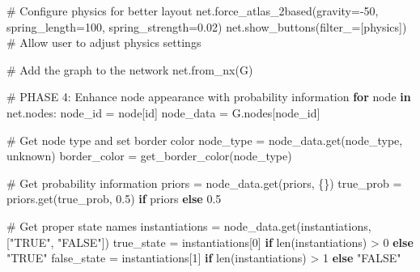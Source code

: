\documentclass[
  11pt,
  letterpaper,
]{book}
\newenvironment{Shaded}{\begin{snugshade}}{\end{snugshade}}
\newcommand{\BuiltInTok}[1]{\textcolor[rgb]{0.00,0.23,0.31}{#1}}
\newcommand{\CommentTok}[1]{\textcolor[rgb]{0.37,0.37,0.37}{#1}}
\newcommand{\ControlFlowTok}[1]{\textcolor[rgb]{0.00,0.23,0.31}{\textbf{#1}}}
\newcommand{\DecValTok}[1]{\textcolor[rgb]{0.68,0.00,0.00}{#1}}
\newcommand{\FloatTok}[1]{\textcolor[rgb]{0.68,0.00,0.00}{#1}}
\newcommand{\KeywordTok}[1]{\textcolor[rgb]{0.00,0.23,0.31}{\textbf{#1}}}
\newcommand{\NormalTok}[1]{\textcolor[rgb]{0.00,0.23,0.31}{#1}}
\newcommand{\OperatorTok}[1]{\textcolor[rgb]{0.37,0.37,0.37}{#1}}
\newcommand{\StringTok}[1]{\textcolor[rgb]{0.13,0.47,0.30}{#1}}
\begin{document}
\begin{Shaded}
\begin{Highlighting}[]
    \CommentTok{\# Configure physics for better layout}
\NormalTok{    net.force\_atlas\_2based(gravity}\OperatorTok{={-}}\DecValTok{50}\NormalTok{, spring\_length}\OperatorTok{=}\DecValTok{100}\NormalTok{, spring\_strength}\OperatorTok{=}\FloatTok{0.02}\NormalTok{)}
\NormalTok{    net.show\_buttons(filter\_}\OperatorTok{=}\NormalTok{[}\StringTok{\textquotesingle{}physics\textquotesingle{}}\NormalTok{])  }\CommentTok{\# Allow user to adjust physics settings}

    \CommentTok{\# Add the graph to the network}
\NormalTok{    net.from\_nx(G)}

    \CommentTok{\# PHASE 4: Enhance node appearance with probability information}
    \ControlFlowTok{for}\NormalTok{ node }\KeywordTok{in}\NormalTok{ net.nodes:}
\NormalTok{        node\_id }\OperatorTok{=}\NormalTok{ node[}\StringTok{\textquotesingle{}id\textquotesingle{}}\NormalTok{]}
\NormalTok{        node\_data }\OperatorTok{=}\NormalTok{ G.nodes[node\_id]}

        \CommentTok{\# Get node type and set border color}
\NormalTok{        node\_type }\OperatorTok{=}\NormalTok{ node\_data.get(}\StringTok{\textquotesingle{}node\_type\textquotesingle{}}\NormalTok{, }\StringTok{\textquotesingle{}unknown\textquotesingle{}}\NormalTok{)}
\NormalTok{        border\_color }\OperatorTok{=}\NormalTok{ get\_border\_color(node\_type)}

        \CommentTok{\# Get probability information}
\NormalTok{        priors }\OperatorTok{=}\NormalTok{ node\_data.get(}\StringTok{\textquotesingle{}priors\textquotesingle{}}\NormalTok{, \{\})}
\NormalTok{        true\_prob }\OperatorTok{=}\NormalTok{ priors.get(}\StringTok{\textquotesingle{}true\_prob\textquotesingle{}}\NormalTok{, }\FloatTok{0.5}\NormalTok{) }\ControlFlowTok{if}\NormalTok{ priors }\ControlFlowTok{else} \FloatTok{0.5}

        \CommentTok{\# Get proper state names}
\NormalTok{        instantiations }\OperatorTok{=}\NormalTok{ node\_data.get(}\StringTok{\textquotesingle{}instantiations\textquotesingle{}}\NormalTok{, [}\StringTok{"TRUE"}\NormalTok{, }\StringTok{"FALSE"}\NormalTok{])}
\NormalTok{        true\_state }\OperatorTok{=}\NormalTok{ instantiations[}\DecValTok{0}\NormalTok{] }\ControlFlowTok{if} \BuiltInTok{len}\NormalTok{(instantiations) }\OperatorTok{\textgreater{}} \DecValTok{0} \ControlFlowTok{else} \StringTok{"TRUE"}
\NormalTok{        false\_state }\OperatorTok{=}\NormalTok{ instantiations[}\DecValTok{1}\NormalTok{] }\ControlFlowTok{if} \BuiltInTok{len}\NormalTok{(instantiations) }\OperatorTok{\textgreater{}} \DecValTok{1} \ControlFlowTok{else} \StringTok{"FALSE"}


\end{Highlighting}
\end{Shaded}
\end{document}
